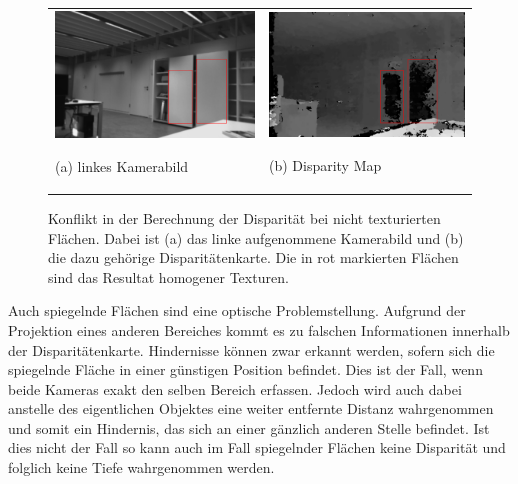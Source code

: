 \begin{figure}[h]
	\centering
	\begin{tabular}{m{6.5cm} m{6.5cm}}
	\includegraphics[width=6.5cm]{img/disparity_error_left.pdf}
	\begin{center} \small (a) linkes Kamerabild \end{center}
	&
	\includegraphics[width=6.5cm]{img/disparity_error.pdf}
	\begin{center} \small (b) Disparity Map \end{center}
	\end{tabular}
    \caption{Konflikt in der Berechnung der Disparität bei nicht texturierten Flächen. Dabei ist (a) das linke aufgenommene Kamerabild und (b) die dazu gehörige Disparitätenkarte. Die in rot markierten Flächen sind das Resultat homogener Texturen.}
    \label{fig:disparity-error-homogeneous}
\end{figure}

\noindent
Auch spiegelnde Flächen sind eine optische Problemstellung. Aufgrund der Projektion eines anderen Bereiches kommt es zu falschen Informationen innerhalb der Disparitätenkarte. Hindernisse können zwar erkannt werden, sofern sich die spiegelnde Fläche in einer günstigen Position befindet. Dies ist der Fall, wenn beide Kameras exakt den selben Bereich erfassen. Jedoch wird auch dabei anstelle des eigentlichen Objektes eine weiter entfernte Distanz wahrgenommen und somit ein Hindernis, das sich an einer gänzlich anderen Stelle befindet. Ist dies nicht der Fall so kann auch im Fall spiegelnder Flächen keine Disparität und folglich keine Tiefe wahrgenommen werden.\\
    
